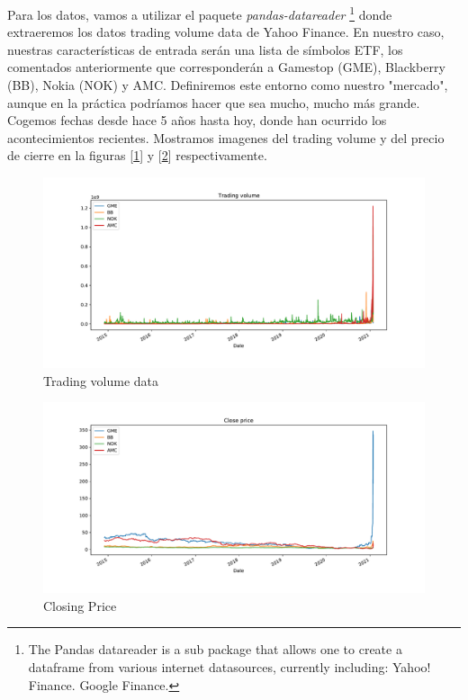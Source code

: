 \documentclass[12pt,twoside]{report}
\begin{document}
Para los datos, vamos a utilizar el paquete \textit{pandas-datareader} \cite{pandas-datareader} \footnote{The Pandas datareader is a sub package that allows one to create a dataframe from various internet datasources, currently including: Yahoo! Finance. Google Finance.} donde extraeremos los datos trading volume data de Yahoo Finance. En nuestro caso, nuestras características de entrada serán una lista de símbolos ETF, los comentados anteriormente que corresponderán a Gamestop (GME), Blackberry (BB), Nokia (NOK) y AMC. Definiremos este entorno como nuestro "mercado", aunque en la práctica podríamos hacer que sea mucho, mucho más grande. Cogemos fechas desde hace 5 años hasta hoy, donde han ocurrido los acontecimientos recientes. Mostramos imagenes del trading volume y del precio de cierre en la figuras [\ref{fig:trading-volume}] y [\ref{fig:closing-price}] respectivamente.

\begin{figure}[H]
\includegraphics[width=\textwidth]{../code/figures/trading_volume.pdf}
\centering
\caption{Trading volume data}
\label{fig:trading-volume}
\end{figure}

\begin{figure}[H]
\includegraphics[width=\textwidth]{../code/figures/close_price.pdf}
\centering
\caption{Closing Price}
\label{fig:closing-price}
\end{figure}
\end{document}
